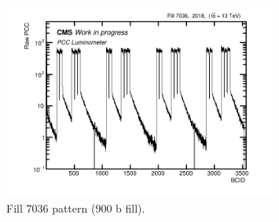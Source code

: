 \newpage
\begin{figure}[H]
\centering
\includegraphics[width=0.8\textwidth]{ashish_thesis/fill_7036_pattern_2.png}
\caption[7036 Fill Patern]{%
  Fill 7036 pattern (900 b fill).
}
\label{fig:af_fit40}
\end{figure}

